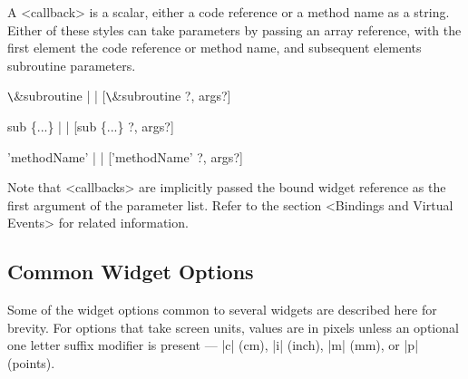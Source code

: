 A <callback> is a scalar, either a code reference or a method name as a
string.  Either of these styles can take parameters by passing an array reference,
with the first element the code reference or method name, and subsequent
elements subroutine parameters.

\verb+\+\&subroutine |     | [\verb+\+\&subroutine ?, args?]

sub \{...\} |        | [sub \{...\} ?, args?]

'methodName' |    |  ['methodName' ?, args?]

Note that  <callbacks> are implicitly passed the bound widget reference
as the first argument of the parameter list.  Refer to the section <Bindings and Virtual Events>
for related information.

\subsection*{Common Widget Options}

Some of the widget options common to several widgets are described
here for brevity. For options that take screen units, values are in
pixels unless an optional one letter suffix modifier is present ---
|c| (cm), |i| (inch), |m| (mm), or |p| (points).

